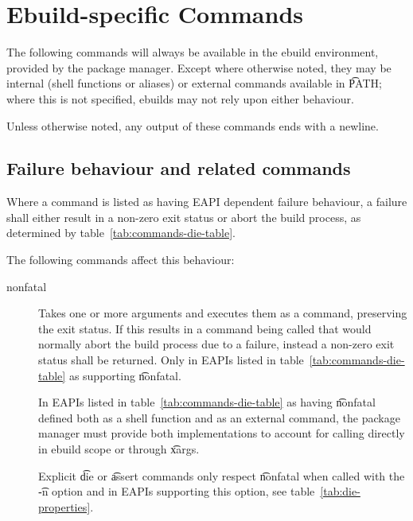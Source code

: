 \section{Ebuild-specific Commands}
\label{sec:pkg-mgr-commands}

The following commands will always be available in the ebuild environment, provided by the package
manager. Except where otherwise noted, they may be internal (shell functions or aliases) or external
commands available in \t{PATH}; where this is not specified, ebuilds may not rely upon either
behaviour.

Unless otherwise noted, any output of these commands ends with a newline.

\subsection{Failure behaviour and related commands}
\label{sec:failure-behaviour}

 Where a command is listed as having EAPI dependent failure behaviour,
a failure shall either result in a non-zero exit status or abort the build process, as determined by
table~\ref{tab:commands-die-table}.

The following commands affect this behaviour:
\nobreakpar
\begin{description}
\item[nonfatal]  Takes one or more arguments and executes them as a command,
    preserving the exit status. If this results in a command being called that would normally abort
    the build process due to a failure, instead a non-zero exit status shall be returned. Only in
    EAPIs listed in table~\ref{tab:commands-die-table} as supporting \t{nonfatal}.

    In EAPIs listed in table~\ref{tab:commands-die-table} as having \t{nonfatal} defined both
    as a shell function and as an external command, the package manager must provide both
    implementations to account for calling directly in ebuild scope or through \t{xargs}.

    Explicit \t{die} or \t{assert} commands only respect \t{nonfatal} when called with the \t{-n}
    option and in EAPIs supporting this option, see table~\ref{tab:die-properties}.
\end{description}

